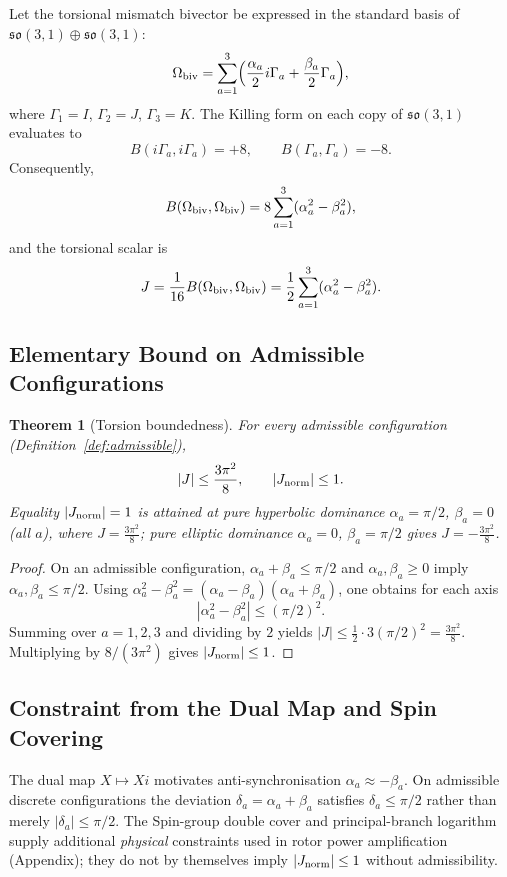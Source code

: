 \documentclass[dvipdfmx,a4paper]{article}
\newtheorem{theorem}{Theorem}[section]
\theoremstyle{definition}
\theoremstyle{remark}
\newcommand{\Jnorm}{J_{\rm norm}}
\newcommand{\Jbound}{\frac{3\pi^2}{8}}
\begin{document}
Let the torsional mismatch bivector be expressed in the standard basis of \( \mathfrak{so}(3,1) \oplus \mathfrak{so}(3,1) \):
\[
\Omega_{\rm biv} = \sum_{a=1}^3 \Bigl( \frac{\alpha_a}{2} i\Gamma_a + \frac{\beta_a}{2} \Gamma_a \Bigr),
\]
where \( \Gamma_1 = I \), \( \Gamma_2 = J \), \( \Gamma_3 = K \). The Killing form on each copy of \( \mathfrak{so}(3,1) \) evaluates to
\[
B(i\Gamma_a, i\Gamma_a) = +8, \qquad B(\Gamma_a, \Gamma_a) = -8.
\]
Consequently,
\[
B(\Omega_{\rm biv}, \Omega_{\rm biv}) = 8 \sum_{a=1}^3 (\alpha_a^2 - \beta_a^2),
\]
and the torsional scalar is
\[
J = \frac{1}{16} B(\Omega_{\rm biv}, \Omega_{\rm biv}) = \frac12 \sum_{a=1}^3 (\alpha_a^2 - \beta_a^2).
\]

\subsection{Elementary Bound on Admissible Configurations}

\begin{theorem}[Torsion boundedness]
\label{thm:torsion-bound}
For every admissible configuration (Definition~\ref{def:admissible}),
\[
|J| \leq \Jbound, \qquad |\Jnorm| \leq 1.
\]
Equality \(|\Jnorm| = 1\) is attained at pure hyperbolic dominance \(\alpha_a = \pi/2\), \(\beta_a = 0\) (all \(a\)), where \(J = \Jbound\); pure elliptic dominance \(\alpha_a = 0\), \(\beta_a = \pi/2\) gives \(J = -\Jbound\).
\end{theorem}

\begin{proof}
On an admissible configuration, \(\alpha_a + \beta_a \leq \pi/2\) and \(\alpha_a,\beta_a \geq 0\) imply \(\alpha_a,\beta_a \leq \pi/2\). Using \(\alpha_a^2 - \beta_a^2 = (\alpha_a - \beta_a)(\alpha_a + \beta_a)\), one obtains for each axis
\[
|\alpha_a^2 - \beta_a^2| \leq (\pi/2)^2.
\]
Summing over \(a = 1,2,3\) and dividing by \(2\) yields \(|J| \leq \frac12 \cdot 3(\pi/2)^2 = \Jbound\). Multiplying by \(8/(3\pi^2)\) gives \(|\Jnorm| \leq 1\).
\end{proof}

\subsection{Constraint from the Dual Map and Spin Covering}

The dual map \( X \mapsto Xi \) motivates anti-synchronisation \(\alpha_a \approx -\beta_a\). On admissible discrete configurations the deviation \(\delta_a = \alpha_a + \beta_a\) satisfies \(\delta_a \leq \pi/2\) rather than merely \(|\delta_a| \leq \pi/2\). The Spin-group double cover and principal-branch logarithm supply additional \emph{physical} constraints used in rotor power amplification (Appendix); they do not by themselves imply \(|\Jnorm| \leq 1\) without admissibility.
\end{document}

